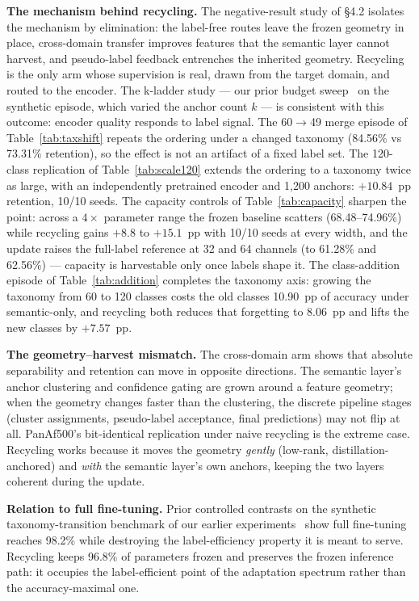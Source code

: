 \documentclass[preprint,12pt,number]{elsarticle}
\begin{document}
\textbf{The mechanism behind recycling.} The negative-result study of \S4.2
isolates the mechanism by elimination: the label-free routes leave the
frozen geometry in place, cross-domain transfer improves features that the
semantic layer cannot harvest, and pseudo-label feedback entrenches the
inherited geometry. Recycling is the only arm whose supervision is real,
drawn from the target domain, and routed to the encoder. The k-ladder study ---
our prior budget sweep~\cite{prior} on the synthetic episode, which varied the anchor
count $k$ --- is consistent with this outcome: encoder quality responds to label
signal. The 60$\rightarrow$49 merge episode of Table~\ref{tab:taxshift} repeats the
ordering under a changed taxonomy (84.56\% vs 73.31\% retention), so the effect
is not an artifact of a fixed label set. The 120-class replication of
Table~\ref{tab:scale120} extends the ordering to a taxonomy twice as large,
with an independently pretrained encoder and 1,200 anchors: $+10.84$~pp
retention, 10/10 seeds. The capacity controls of Table~\ref{tab:capacity}
sharpen the point: across a $4\times$ parameter range the frozen baseline
scatters (68.48--74.96\%) while recycling gains $+8.8$ to $+15.1$~pp with
10/10 seeds at every width, and the update raises the full-label reference at
32 and 64 channels (to 61.28\% and 62.56\%) --- capacity is harvestable only
once labels shape it. The class-addition episode of Table~\ref{tab:addition}
completes the taxonomy axis: growing the taxonomy from 60 to 120 classes
costs the old classes 10.90~pp of accuracy under semantic-only, and
recycling both reduces that forgetting to 8.06~pp and lifts the new classes
by $+7.57$~pp.

\textbf{The geometry--harvest mismatch.}
The cross-domain arm shows that absolute separability and retention can move
in opposite directions. The semantic layer's anchor clustering and confidence
gating are grown around a feature geometry; when the geometry changes faster
than the clustering, the discrete pipeline stages (cluster assignments,
pseudo-label acceptance, final predictions) may not flip at all. PanAf500's
bit-identical replication under naive recycling is the extreme case.
Recycling works because it moves the geometry \emph{gently} (low-rank,
distillation-anchored) and \emph{with} the semantic layer's own anchors, keeping
the two layers coherent during the update.

\textbf{Relation to full fine-tuning.} Prior controlled contrasts on the
synthetic taxonomy-transition benchmark of our earlier experiments~\cite{prior} show full
fine-tuning reaches 98.2\% while destroying the label-efficiency property it
is meant to serve. Recycling keeps 96.8\% of parameters frozen and preserves
the frozen inference path: it occupies the label-efficient point of the
adaptation spectrum rather than the accuracy-maximal one.
\end{document}
